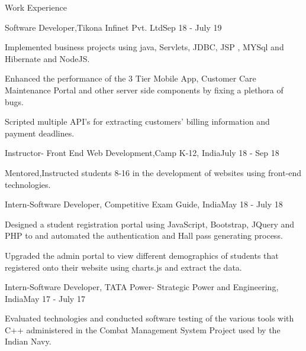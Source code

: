 \documentclass{resume} %
\begin{document}
\vspace{-1mm}
\begin{rSection}{Work Experience}

\begin{rSubsection}{Software Developer,Tikona Infinet Pvt. Ltd}{Sep 18 - July 19}{}

    \item Implemented business projects using java, Servlets, JDBC, JSP , MYSql and Hibernate and NodeJS.
\item Enhanced the performance of the 3 Tier Mobile App, Customer Care Maintenance Portal and other server side components by fixing a plethora of bugs.
\item Scripted multiple API's for extracting customers' billing information and payment deadlines.

\end{rSubsection}
\begin{rSubsection}{Instructor- Front End Web Development,Camp K-12, India}{July 18 - Sep 18}{}{}
\item Mentored,Instructed students 8-16 in the development of websites using front-end technologies.
\end{rSubsection}

\begin{rSubsection}{Intern-Software Developer, Competitive Exam Guide, India}{May 18 - July 18}{}{}
\item Designed a student registration portal using JavaScript, Bootstrap, JQuery and PHP to and automated the authentication and Hall pass generating process.
\item Upgraded the admin portal to view different demographics of students that registered onto their website using charts.js and extract the data.
\end{rSubsection}

\begin{rSubsection}{Intern-Software Developer, TATA Power- Strategic Power and Engineering, India}{May 17 - July 17}{}{}
\item Evaluated technologies and conducted software testing of the various tools with C++ administered in the Combat Management System Project used by the Indian Navy.

\end{rSubsection}




\end{rSection}
\end{document}
